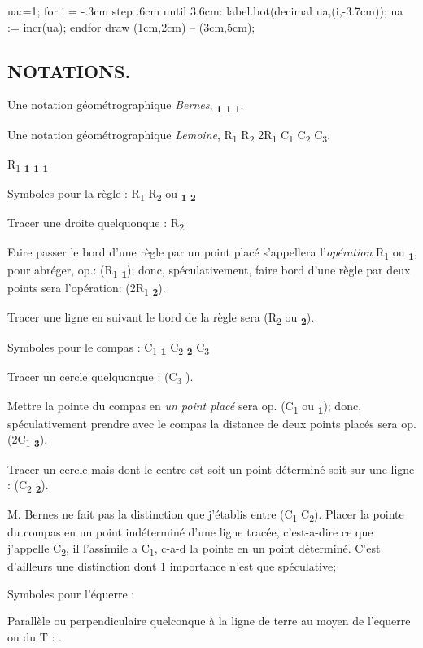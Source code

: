 \documentclass[12pt,a4paper,twocolumn]{book} %
\newcommand{\Ra}[1]{\textcolor{rtLightBlue900}R\textsubscript{\textcolor{rtLightBlue900}{#1}}}
\newcommand{\Rab}[1]{\small{\textcolor{rtLightBlue900}{2}}\textcolor{rtLightBlue900}R\textsubscript{\textcolor{rtLightBlue900}{#1}}}
\newcommand{\gd}[1]{\textbf{\textdelta}\textsubscript{\textbf{#1}}}
\newcommand{\gc}[1]{\textbf{\textgamma}\textsubscript{\textbf{#1}}}
\newcommand{\gq}[1]{\textbf{\textepsilon}\textsubscript{\textbf{#1}}}
\newcommand{\Ca}[1]{\textcolor{rtLightBlue900}C\textsubscript{\textcolor{rtLightBlue900}{#1}}}
\begin{document}
\begin{mpdisplay}
ua:=1;
for i = -.3cm step .6cm until 3.6cm:
    label.bot(decimal ua,(i,-3.7cm));
    ua := incr(ua);
endfor
  draw (1cm,2cm) -- (3cm,5cm);
\end{mpdisplay}


\subsection{NOTATIONS.}

Une notation géométrographique \emph{Bernes},  \gd{1} \gc{1} \gq{1}.

Une notation géométrographique \emph{Lemoine}, \Ra{1} \Ra{2} \Rab{1} \Ca{1} \Ca{2} \Ca{3}.


\Ra{1} \gd{1} \gc{1} \gq{1}

Symboles pour la règle : \Ra{1} \Ra{2} ou \gd{1} \gd{2}

Tracer une droite quelquonque : \Ra{2}  \gd{}

Faire passer le bord d'une règle par un point placé s'appellera l'\emph{opération} \Ra{1} ou \gd{1}, pour abréger, op.: (\Ra{1} \gd{1}); donc, spéculativement, faire bord d'une règle par deux points sera l'opération: (\Rab{1}  \gd{2}).


Tracer une ligne en suivant le bord de la règle sera (\Ra{2} ou \gd{2}).

Symboles pour le compas : \Ca{1} \gc{1} \Ca{2} \gc{2} \Ca{3}  \gc{}

Tracer un cercle quelquonque : (\Ca{3} \gc{}).


Mettre la pointe du compas en \emph{un point placé} sera op. (\Ca{1} ou \gc{1}); donc, spéculativement prendre avec le compas la distance de deux points placés sera op. (2\Ca{1} \gc{3}).

Tracer un cercle mais dont le centre est soit un point déterminé soit sur une ligne  : (\Ca{2} \gc{2}).




M. Bernes ne fait pas la distinction que j'établis entre (\Ca{1} \Ca{2}). Placer la pointe du compas en un point indéterminé d'une ligne tracée, c'est-a-dire ce que j'appelle \Ca{2}, il l'assimile a
\Ca{1}, c-a-d la pointe en un point déterminé. C'est d'ailleurs
une distinction dont 1 importance n'est que spéculative;


Symboles pour l'équerre :

Parallèle ou perpendiculaire quelconque à la ligne de terre au moyen de l'equerre ou du T : \gq{} .
\end{document}
